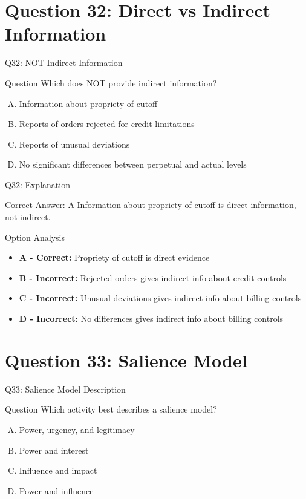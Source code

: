 \documentclass{beamer}
\begin{document}
	\section{Question 32: Direct vs Indirect Information}
	
	\begin{frame}{Q32: NOT Indirect Information}
		\begin{block}{Question}
			Which does NOT provide indirect information?
		\end{block}
		\begin{enumerate}[(A)]
			\item Information about propriety of cutoff
			\item Reports of orders rejected for credit limitations
			\item Reports of unusual deviations
			\item No significant differences between perpetual and actual levels
		\end{enumerate}
	\end{frame}
	
	\begin{frame}{Q32: Explanation}
		\begin{block}{Correct Answer: A}
			Information about propriety of cutoff is direct information, not indirect.
		\end{block}
		\begin{block}{Option Analysis}
			\begin{itemize}
				\item \textbf{A - Correct:} Propriety of cutoff is direct evidence
				\item \textbf{B - Incorrect:} Rejected orders gives indirect info about credit controls
				\item \textbf{C - Incorrect:} Unusual deviations gives indirect info about billing controls
				\item \textbf{D - Incorrect:} No differences gives indirect info about billing controls
			\end{itemize}
		\end{block}
	\end{frame}
	
	\section{Question 33: Salience Model}
	
	\begin{frame}{Q33: Salience Model Description}
		\begin{block}{Question}
			Which activity best describes a salience model?
		\end{block}
		\begin{enumerate}[(A)]
			\item Power, urgency, and legitimacy
			\item Power and interest
			\item Influence and impact
			\item Power and influence
		\end{enumerate}
	\end{frame}
	
\end{document}

